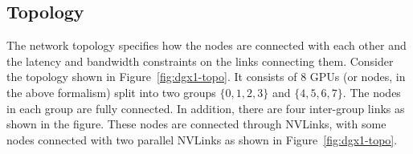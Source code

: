 \begin{comment}
    For instance, given a set of nodes each having an array of data, the \allreduce primitive computes the sum (or some specified associative operation) of all these arrays and stores the result in each of these arrays. 

Computing the primitives such as \allreduce requires the nodes to communicate. This communication usually happens in smaller chunks of the input array. Given $N$ nodes, say we split the input array into $N$ chunks, where $c_{i,j}$ represents the $i$th chunk at node $j$. One way to compute \allreduce is as follows. First, we compute at node $i$, a partial sum $d_i = \sum_j c_{i,j}$. These reductions can be performed by arranging $N$ nodes in a spanning tree and communicating chunks $c_{i,j}$ along the tree. Note, there are $N$ parallel reductions each possibly using a different spanning tree. This arrangement of reduced data is called the \reducescatter primitive. Once we have the chunks $d_i$, we can perform an \allgather operation by ensuring each node has a copy of $d_i$. In essence, \allgather involves $N$ simultaneous broadcasts of $d_i$ from node $i$. Thus, we have implemented \allreduce by performing an \reducescatter followed by an \allgather.
\todo{I think the ``$N$ parallel reductions each possibly using a different spanning tree'' makes this confusing---is this describing an approach where each node reduces $1/N$ of the chunks?}
\todo{say "compute at node $i$, a partial sum" of chunk $i$.}
\todo{they're are a part of the sum of arrays. they are not really partial sums, in the sense that, e.g., only data from half of the nodes are added.}
\todo{"there are $N$ parallel reductions"=>these $N$ parallel reductions}

Implementing a collective communication primitive depends on the topology. For instance, when executing parallel reductions or broadcasts in the implementation above, the algorithm has to choose different spanning trees to utilize the bandwidth on all links in the topology. Similarly, the algorithm has to choose the ideal chunk size to use for communication. We will demonstrate these choices for the \dgxone topology described below. 
\todo{"Implementing" $\ldots$ efficiently}
\todo{"has to chose ": might have to choose}
\end{comment}

\subsection{Topology}
The network topology specifies how the nodes are connected with each other and the latency and bandwidth constraints on the links connecting them. Consider the \dgxone topology shown in Figure~\ref{fig:dgx1-topo}. It consists of $8$ GPUs (or nodes, in the above formalism) split into two groups $\{0,1,2,3\}$ and $\{4,5,6,7\}$. The nodes in each group are fully connected. In addition, there are four inter-group links as shown in the figure. These nodes are connected through 
NVLinks, with some nodes connected with two parallel NVLinks as shown in Figure~\ref{fig:dgx1-topo}.  

